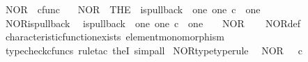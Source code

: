 \begin{isabellebody}
\endisatagproof
{\isafoldproof}%
%
\isadelimproof
%
\endisadelimproof
%
\isadelimdocument
%
\endisadelimdocument
%
\isatagdocument
%
\isamarkuptrue%
%
\endisatagdocument
{\isafolddocument}%
%
\isadelimdocument
%
\endisadelimdocument
{}\isamarkupfalse%
\ NOR\ {\isacharcolon}{\kern0pt}{\isacharcolon}{\kern0pt}\ {\isachardoublequoteopen}cfunc{\isachardoublequoteclose}\ \isanewline
\ \ {\isachardoublequoteopen}NOR\ {\isacharequal}{\kern0pt}\ {\isacharparenleft}{\kern0pt}THE\ {\isasymchi}{\isachardot}{\kern0pt}\ is{\isacharunderscore}{\kern0pt}pullback\ \ one\ one\ {\isacharparenleft}{\kern0pt}{\isasymOmega}{\isasymtimes}\isactrlsub c{\isasymOmega}{\isacharparenright}{\kern0pt}\ {\isasymOmega}\ {\isacharparenleft}{\kern0pt}{\isasymbeta}\isactrlbsub one\isactrlesub {\isacharparenright}{\kern0pt}\ {\isasymt}\ {\isasymlangle}{\isasymf}{\isacharcomma}{\kern0pt}\ {\isasymf}{\isasymrangle}\ {\isasymchi}{\isacharparenright}{\kern0pt}{\isachardoublequoteclose}\isanewline
\isanewline
{}\isamarkupfalse%
\ NOR{\isacharunderscore}{\kern0pt}is{\isacharunderscore}{\kern0pt}pullback{\isacharcolon}{\kern0pt}\isanewline
\ \ {\isachardoublequoteopen}is{\isacharunderscore}{\kern0pt}pullback\ \ one\ one\ {\isacharparenleft}{\kern0pt}{\isasymOmega}{\isasymtimes}\isactrlsub c{\isasymOmega}{\isacharparenright}{\kern0pt}\ {\isasymOmega}\ {\isacharparenleft}{\kern0pt}{\isasymbeta}\isactrlbsub one\isactrlesub {\isacharparenright}{\kern0pt}\ {\isasymt}\ {\isasymlangle}{\isasymf}{\isacharcomma}{\kern0pt}\ {\isasymf}{\isasymrangle}\ NOR{\isachardoublequoteclose}\isanewline
%
\isadelimproof
\ \ %
\endisadelimproof
%
\isatagproof
{}\isamarkupfalse%
\ NOR{\isacharunderscore}{\kern0pt}def\isanewline
\ \ \isamarkupfalse%
\ characteristic{\isacharunderscore}{\kern0pt}function{\isacharunderscore}{\kern0pt}exists\ element{\isacharunderscore}{\kern0pt}monomorphism\isanewline
\ \ \isamarkupfalse%
\ {\isacharparenleft}{\kern0pt}typecheck{\isacharunderscore}{\kern0pt}cfuncs{\isacharcomma}{\kern0pt}\ rule{\isacharunderscore}{\kern0pt}tac\ the{}I{}{\isacharcomma}{\kern0pt}\ simp{\isacharunderscore}{\kern0pt}all{\isacharparenright}{\kern0pt}%
\endisatagproof
{\isafoldproof}%
%
\isadelimproof
\isanewline
%
\endisadelimproof
\isanewline
{}\isamarkupfalse%
\ NOR{\isacharunderscore}{\kern0pt}type{\isacharbrackleft}{\kern0pt}type{\isacharunderscore}{\kern0pt}rule{\isacharbrackright}{\kern0pt}{\isacharcolon}{\kern0pt}\isanewline
\ \ {\isachardoublequoteopen}NOR\ {\isacharcolon}{\kern0pt}\ {\isasymOmega}\ {\isasymtimes}\isactrlsub c\ {\isasymOmega}\ {\isasymrightarrow}\ {\isasymOmega}{\isachardoublequoteclose}\isanewline

\end{isabellebody}
